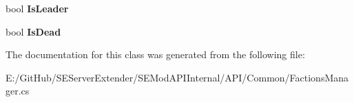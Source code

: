 \begin{DoxyCompactItemize}
\item 
\hypertarget{class_s_e_mod_a_p_i_internal_1_1_a_p_i_1_1_common_1_1_faction_member_a21a5200283ac506181b873a7d00bf0f9}{}bool {\bfseries Is\+Leader}\label{class_s_e_mod_a_p_i_internal_1_1_a_p_i_1_1_common_1_1_faction_member_a21a5200283ac506181b873a7d00bf0f9}

\item 
\hypertarget{class_s_e_mod_a_p_i_internal_1_1_a_p_i_1_1_common_1_1_faction_member_ac34c2b6972787299ea1d80b04de1dc45}{}bool {\bfseries Is\+Dead}\label{class_s_e_mod_a_p_i_internal_1_1_a_p_i_1_1_common_1_1_faction_member_ac34c2b6972787299ea1d80b04de1dc45}

\end{DoxyCompactItemize}


The documentation for this class was generated from the following file\+:\begin{DoxyCompactItemize}
\item 
E\+:/\+Git\+Hub/\+S\+E\+Server\+Extender/\+S\+E\+Mod\+A\+P\+I\+Internal/\+A\+P\+I/\+Common/Factions\+Manager.\+cs\end{DoxyCompactItemize}
